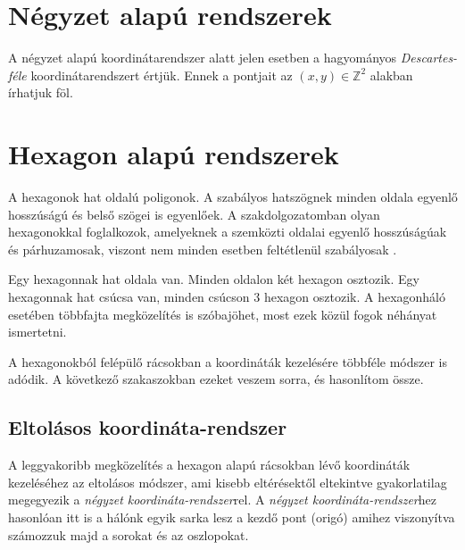 
\section{Négyzet alapú rendszerek}

A négyzet alapú koordinátarendszer alatt jelen esetben a hagyományos \textit{Descartes-féle} koordinátarendszert értjük. Ennek a pontjait az $(x, y) \in \mathbb{Z}^2$ alakban írhatjuk föl.


\section{Hexagon alapú rendszerek}
\label{sec:hexagon}

A hexagonok hat oldalú poligonok. A szabályos hatszögnek minden oldala egyenlő hosszúságú és belső szögei is egyenlőek. A szakdolgozatomban olyan hexagonokkal foglalkozok, amelyeknek a szemközti oldalai egyenlő hosszúságúak és párhuzamosak, viszont nem minden esetben feltétlenül szabályosak \cite{redblobgamesHexagonalGrids}.

Egy hexagonnak hat oldala van. Minden oldalon két hexagon osztozik. Egy hexagonnak hat csúcsa van, minden csúcson 3 hexagon osztozik. A hexagonháló esetében többfajta megközelítés is szóbajöhet, most ezek közül fogok néhányat ismertetni.

A hexagonokból felépülő rácsokban a koordináták kezelésére többféle módszer is adódik. A következő szakaszokban ezeket veszem sorra, és hasonlítom össze.

\subsection{Eltolásos koordináta-rendszer}

A leggyakoribb megközelítés a hexagon alapú rácsokban lévő koordináták kezeléséhez az eltolásos módszer, ami kisebb eltérésektől eltekintve gyakorlatilag megegyezik a \textit{négyzet koordináta-rendszer}rel. A \textit{négyzet koordináta-rendszer}hez hasonlóan itt is a hálónk egyik sarka lesz a kezdő pont (origó) amihez viszonyítva számozzuk majd a sorokat és az oszlopokat.

